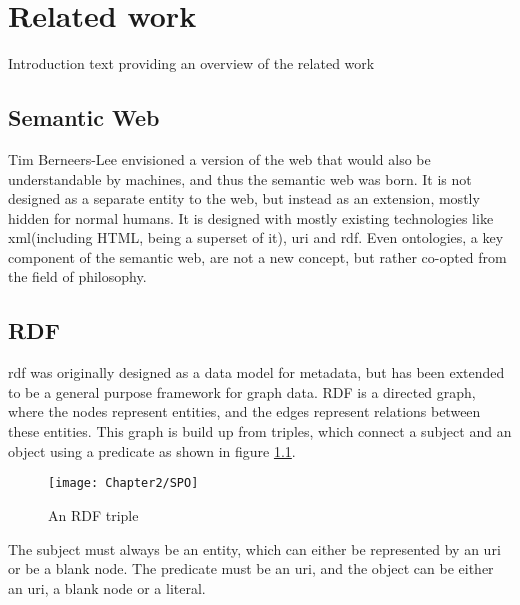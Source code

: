 
\chapter{Related work}
\label{chapter:related_work}

Introduction text providing an overview of the related work

\section{Semantic Web}
Tim Berneers-Lee envisioned a version of the web that would also be understandable by machines, and thus the semantic web was born. It is not designed as a separate entity to the web, but instead as an extension, mostly hidden for normal humans. It is designed with mostly existing technologies like \acrshort{xml}(including HTML, being a superset of it), \acrshort{uri} and \acrshort{rdf}. Even ontologies, a key component of the semantic web, are not a new concept, but rather co-opted from the field of philosophy. \citep{thesemanticweb}

\section{RDF}
\acrshort{rdf} was originally designed as a data model for metadata, but has been extended to be a general purpose framework for graph data. RDF is a directed graph, where the nodes represent entities, and the edges represent relations between these entities. This graph is build up from triples, which connect a subject and an object using a predicate as shown in figure \ref{fig:rdf_triple}. 

\begin{figure}
    \centering
    \texttt{[image: Chapter2/SPO]}
    \caption{An RDF triple}
    \label{fig:rdf_triple}
\end{figure}

The subject must always be an entity, which can either be represented by an \acrshort{uri} or be a blank node. The predicate must be an \acrshort{uri}, and the object can be either an \acrshort{uri}, a blank node or a literal. \citep{rdfprimer}

